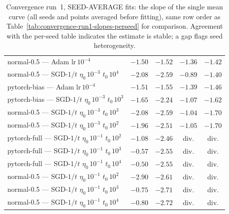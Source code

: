 \begin{table}[H]
\begin{tabular}{@{}>{\raggedright\arraybackslash}p{5.2cm} cccc@{}}
normal-0.5 --- Adam $\mathrm{lr}\,10^{-4}$ & $-1.50$ & $-1.52$ & $-1.36$ & $-1.42$ \\
normal-0.5 --- SGD-$1/t$ $\eta_0\,10^{-3}$ $t_0\,10^{4}$ & $-2.08$ & $-2.59$ & $-0.89$ & $-1.40$ \\
pytorch-bias --- Adam $\mathrm{lr}\,10^{-4}$ & $-1.51$ & $-1.55$ & $-1.39$ & $-1.46$ \\
pytorch-bias --- SGD-$1/t$ $\eta_0\,10^{-3}$ $t_0\,10^{3}$ & $-1.65$ & $-2.24$ & $-1.07$ & $-1.62$ \\
normal-0.5 --- SGD-$1/t$ $\eta_0\,10^{-3}$ $t_0\,10^{3}$ & $-2.08$ & $-2.59$ & $-1.04$ & $-1.70$ \\
normal-0.5 --- SGD-$1/t$ $\eta_0\,10^{-3}$ $t_0\,10^{2}$ & $-1.96$ & $-2.51$ & $-1.05$ & $-1.70$ \\
pytorch-full --- SGD-$1/t$ $\eta_0\,10^{-1}$ $t_0\,10^{2}$ & $-1.08$ & $-2.46$ & div. & div. \\
pytorch-full --- SGD-$1/t$ $\eta_0\,10^{-1}$ $t_0\,10^{3}$ & $-0.57$ & $-2.55$ & div. & div. \\
pytorch-full --- SGD-$1/t$ $\eta_0\,10^{-1}$ $t_0\,10^{4}$ & \textbf{$-0.50$} & $-2.55$ & div. & div. \\
normal-0.5 --- SGD-$1/t$ $\eta_0\,10^{-1}$ $t_0\,10^{2}$ & $-2.90$ & $-2.61$ & div. & div. \\
normal-0.5 --- SGD-$1/t$ $\eta_0\,10^{-1}$ $t_0\,10^{3}$ & $-0.75$ & $-2.71$ & div. & div. \\
normal-0.5 --- SGD-$1/t$ $\eta_0\,10^{-1}$ $t_0\,10^{4}$ & $-0.80$ & $-2.72$ & div. & div. \\
\bottomrule
\end{tabular}
\caption{Convergence run~1, SEED-AVERAGE fits: the slope of the single mean curve (all seeds and points averaged before fitting), same row order as Table~\ref{tab:convergence-run1-slopes-perseed} for comparison. Agreement with the per-seed table indicates the estimate is stable; a gap flags seed heterogeneity.}
\label{tab:convergence-run1-slopes-seedavg}
\end{table}
